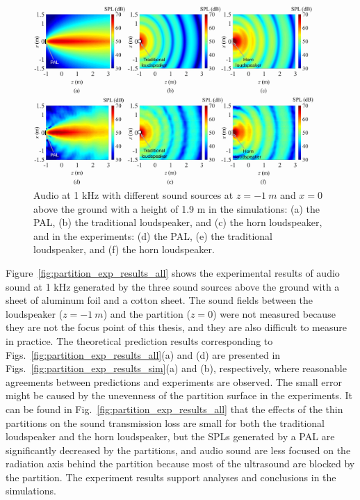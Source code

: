 \begin{figure}[!htb]
    \centering
    \includegraphics[width = 0.95\textwidth]{Figures/pending/Comparison of experiment and simulations100.jpg}
    \caption{Audio  at 1 kHz with different sound sources at $z = \SI{-1}{ m}$ and $x = 0$ above the ground with a height of 1.9 m in the simulations: (a) the PAL, (b) the traditional loudspeaker, and (c) the horn loudspeaker, and in the experiments: (d) the PAL, (e) the traditional loudspeaker, and (f) the horn loudspeaker.}
    \label{fig:partition_exp_results}
\end{figure}

Figure~\ref{fig:partition_exp_results_all} shows the experimental results of audio sound at 1 kHz generated by the three sound sources above the ground with a sheet of aluminum foil and a cotton sheet. 
The sound fields between the loudspeaker ($z = \SI{-1}{ m}$) and the partition ($z = 0$) were not measured because they are not the focus point of this thesis, and {they are} also difficult to measure in practice. 
The theoretical prediction results corresponding to Figs.~\ref{fig:partition_exp_results_all}(a) and (d) are presented in Figs.~\ref{fig:partition_exp_results_sim}(a) and (b), respectively, where reasonable agreements between predictions and experiments are observed. 
The small error might be caused by the unevenness of the partition surface in the experiments. 
It can be found in Fig.~\ref{fig:partition_exp_results_all} that the effects of the thin partitions on the sound transmission loss are small for both the traditional loudspeaker and the horn loudspeaker, but the SPLs generated by a PAL are significantly decreased by the partitions, and audio sound are less focused on the radiation axis behind the partition because most of the ultrasound are blocked by the partition. 
The experiment results support analyses and conclusions in the simulations. 

